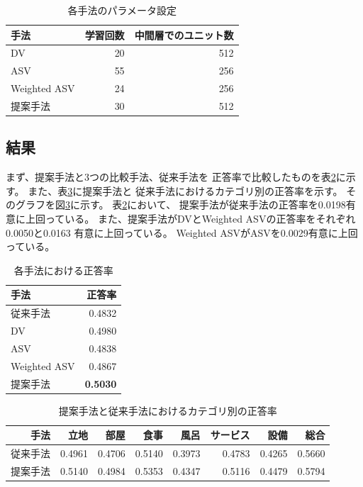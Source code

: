 \begin{table}
  \caption{各手法のパラメータ設定}
  \centering
  \begin{tabular}{l | r r} \label{tab:ParametersOfMethods}
    手法 & 学習回数 & 中間層でのユニット数 \\
    \hline
    DV & 20 & 512 \\
    ASV & 55 & 256 \\
    Weighted ASV & 24 & 256 \\
    提案手法 & 30 & 512 \\
  \end{tabular}
\end{table}


\subsection{結果}

まず、提案手法と3つの比較手法、従来手法\cite{fujitani15}を
正答率で比較したものを表\ref{tab:AccuraciesOfMethods}に示す。
また、表\ref{tab:AccuraciesPerCategory}に提案手法と
従来手法\cite{fujitani15}におけるカテゴリ別の正答率を示す。
そのグラフを図\ref{tab:AccuraciesPerCategory}に示す。
表\ref{tab:AccuraciesOfMethods}において、
提案手法が従来手法\cite{fujitani15}の正答率を0.0198有意に上回っている。
また、提案手法がDVとWeighted ASVの正答率をそれぞれ0.0050と0.0163
有意に上回っている。
Weighted ASVがASVを0.0029有意に上回っている。

\begin{table}
  \caption{各手法における正答率}
  \centering
  \begin{tabular}{l | r} \label{tab:AccuraciesOfMethods}
    手法 & 正答率 \\
    \hline
    従来手法\cite{fujitani15} & 0.4832 \\
    DV & 0.4980 \\
    ASV & 0.4838 \\
    Weighted ASV & 0.4867 \\
    提案手法 & \textbf{0.5030} \\
  \end{tabular}
\end{table}

\begin{table}
  \caption{提案手法と従来手法\cite{fujitani15}におけるカテゴリ別の正答率}
  \centering
  \begin{tabular}{r | r r r r r r r} \label{tab:AccuraciesPerCategory}
    手法 & 立地 & 部屋 & 食事 & 風呂 & サービス & 設備 & 総合 \\
    \hline
    従来手法\cite{fujitani15}
        & 0.4961 & 0.4706 & 0.5140 & 0.3973 & 0.4783 & 0.4265 & 0.5660 \\
    提案手法 & 0.5140 & 0.4984 & 0.5353 & 0.4347 & 0.5116 & 0.4479 & 0.5794 \\
  \end{tabular}
\end{table}

